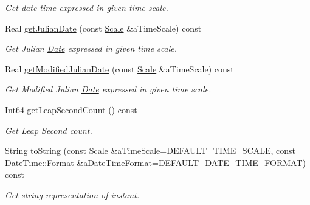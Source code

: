 \begin{DoxyCompactItemize}
\begin{DoxyCompactList}\small\item\em Get date-\/time expressed in given time scale. \end{DoxyCompactList}\item 
Real \hyperlink{classostk_1_1physics_1_1time_1_1_instant_a71b3a5992123fddb3a3539dc99df66c1}{get\+Julian\+Date} (const \hyperlink{namespaceostk_1_1physics_1_1time_adf23d37bd8641fb76a0e98ab46a70df7}{Scale} \&a\+Time\+Scale) const
\begin{DoxyCompactList}\small\item\em Get Julian \hyperlink{classostk_1_1physics_1_1time_1_1_date}{Date} expressed in given time scale. \end{DoxyCompactList}\item 
Real \hyperlink{classostk_1_1physics_1_1time_1_1_instant_aeaaf152c806c5f98ad03933ede05fe2d}{get\+Modified\+Julian\+Date} (const \hyperlink{namespaceostk_1_1physics_1_1time_adf23d37bd8641fb76a0e98ab46a70df7}{Scale} \&a\+Time\+Scale) const
\begin{DoxyCompactList}\small\item\em Get Modified Julian \hyperlink{classostk_1_1physics_1_1time_1_1_date}{Date} expressed in given time scale. \end{DoxyCompactList}\item 
Int64 \hyperlink{classostk_1_1physics_1_1time_1_1_instant_aceab87ef79e6f5d1438ac78e11bdcd6f}{get\+Leap\+Second\+Count} () const
\begin{DoxyCompactList}\small\item\em Get Leap Second count. \end{DoxyCompactList}\item 
String \hyperlink{classostk_1_1physics_1_1time_1_1_instant_ad2848890ee69709ed5540d1c8fa017e1}{to\+String} (const \hyperlink{namespaceostk_1_1physics_1_1time_adf23d37bd8641fb76a0e98ab46a70df7}{Scale} \&a\+Time\+Scale=\hyperlink{_instant_8hpp_a83fe97f5695ec6cbf25b55bb0cf31a6e}{D\+E\+F\+A\+U\+L\+T\+\_\+\+T\+I\+M\+E\+\_\+\+S\+C\+A\+LE}, const \hyperlink{classostk_1_1physics_1_1time_1_1_date_time_a1d21d982b18bf56ed684fcf1cd97e092}{Date\+Time\+::\+Format} \&a\+Date\+Time\+Format=\hyperlink{_instant_8hpp_a29e15915855da5a5ac528ed12373dda4}{D\+E\+F\+A\+U\+L\+T\+\_\+\+D\+A\+T\+E\+\_\+\+T\+I\+M\+E\+\_\+\+F\+O\+R\+M\+AT}) const
\begin{DoxyCompactList}\small\item\em Get string representation of instant. \end{DoxyCompactList}\end{DoxyCompactItemize}
